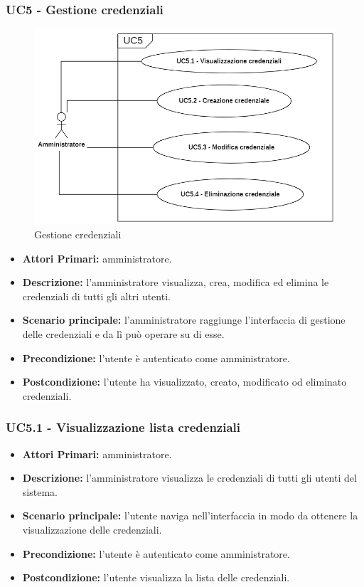 \subsubsection{ UC5 - Gestione credenziali}
\begin{figure}[H]
	\centering
	\includegraphics[width=15cm]{res/images/UC5.png}
	\caption{Gestione credenziali}
	\label{fig:Gestione credenziali}
\end{figure}
\begin{itemize}
           	\item\textbf{Attori Primari:}
           	amministratore.
           	\item\textbf{Descrizione:} 
           	l'amministratore visualizza, crea, modifica ed elimina le credenziali di tutti gli altri utenti.
           	\item\textbf{Scenario principale:} 
           	l'amministratore raggiunge l'interfaccia di gestione delle credenziali e da lì può operare su di esse.
           	\item\textbf{Precondizione:} 
           	l'utente è autenticato come amministratore.
           	\item\textbf{Postcondizione:}
           	l'utente ha visualizzato, creato, modificato od eliminato credenziali.
\end{itemize}

\subsubsection{ UC5.1 - Visualizzazione lista credenziali}
\begin{itemize}
	\item\textbf{Attori Primari:} 
	amministratore.
	\item\textbf{Descrizione:} 
	l'amministratore visualizza le credenziali di tutti gli utenti del sistema.
	\item\textbf{Scenario principale:} 
	l'utente naviga nell'interfaccia in modo da ottenere la visualizzazione delle credenziali.
	\item\textbf{Precondizione:} 
	l'utente è autenticato come amministratore.
	\item\textbf{Postcondizione:}
	l'utente visualizza la lista delle credenziali.
\end{itemize}

